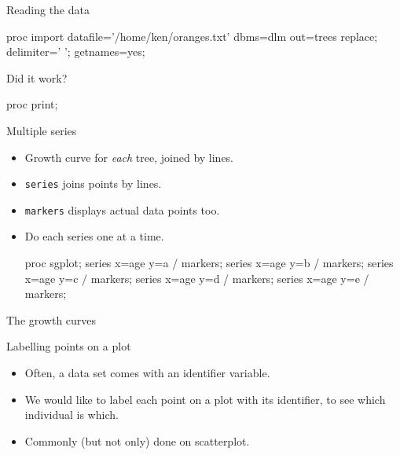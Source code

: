 \documentclass[unknownkeysallowed]{beamer}\usepackage[]{graphicx}\usepackage[]{color}
\begin{document}
\begin{frame}[fragile]{Reading the data}
  
    \begin{Datastep}
proc import
  datafile='/home/ken/oranges.txt'
    dbms=dlm
    out=trees
    replace;
  delimiter=' ';
  getnames=yes;
    \end{Datastep}

  
\end{frame}

\begin{frame}[fragile]{Did it work?}
  
  \begin{Sascode}[store=ora]
proc print;    
  \end{Sascode}
  
  
\end{frame}

\begin{frame}[fragile]{Multiple series}

  \begin{itemize}
  \item Growth curve for \emph{each} tree, joined by lines.
  \item \texttt{series} joins points by lines.
  \item \texttt{markers} displays actual data points too.
  \item Do each series one at a time.
\begin{Sascode}[store=mjd]
proc sgplot;
  series x=age y=a / markers;
  series x=age y=b / markers;
  series x=age y=c / markers;
  series x=age y=d / markers;
  series x=age y=e / markers;
\end{Sascode}
  \end{itemize}
  
\end{frame}

\begin{frame}[fragile]{The growth curves}

  
\end{frame}

\begin{frame}[fragile]{Labelling points on a plot}
  
  \begin{itemize}
    \item Often, a data set comes with an identifier variable.
    \item We would like to label each point on a plot with its
      identifier, to see which individual is which.
    \item Commonly (but not only) done on scatterplot.
  \end{itemize}
  
\end{frame}
\end{document}
